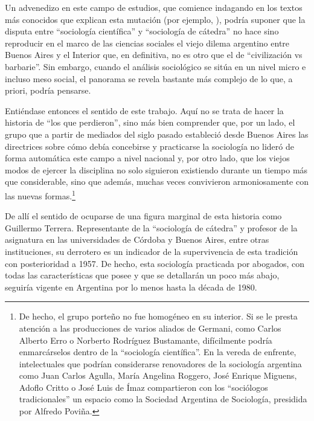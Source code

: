 Un advenedizo en este campo de estudios, que comience indagando en los textos más conocidos que explican esta mutación (por ejemplo, \cite{1681-GERMANI1964}), podría suponer que la disputa entre \enquote{sociología científica} y \enquote{sociología de cátedra} no hace sino reproducir en el marco de las ciencias sociales el viejo dilema argentino entre Buenos Aires y el Interior que, en definitiva, no es otro que el de \enquote{civilización vs barbarie}. Sin embargo, cuando el análisis sociológico se sitúa en un nivel micro e incluso meso social, el panorama se revela bastante más complejo de lo que, a priori, podría pensarse.

Entiéndase entonces el sentido de este trabajo. Aquí no se trata de hacer la historia de \enquote{los que perdieron}, sino más bien comprender que, por un lado, el grupo que a partir de mediados del siglo pasado estableció desde Buenos Aires las directrices sobre cómo debía concebirse y practicarse la sociología no lideró de forma automática este campo a nivel nacional y, por otro lado, que los viejos modos de ejercer la disciplina no solo siguieron existiendo durante un tiempo más que considerable, sino que además, muchas veces convivieron armoniosamente con las nuevas formas.\footnote{De hecho, el grupo porteño no fue homogéneo en su interior. Si se le presta atención a las producciones de varios aliados de Germani, como Carlos Alberto Erro o Norberto Rodríguez Bustamante, difícilmente podría enmarcárselos dentro de la \enquote{sociología científica}. En la vereda de enfrente, intelectuales que podrían considerarse renovadores de la sociología argentina como Juan Carlos Agulla, María Angelina Roggero, José Enrique Miguens, Adoflo Critto o José Luis de Ímaz compartieron con los \enquote{sociólogos tradicionales} un espacio como la Sociedad Argentina de Sociología, presidida por Alfredo Poviña.}

De allí el sentido de ocuparse de una figura marginal de esta historia como Guillermo Terrera. Representante de la \enquote{sociología de cátedra} y profesor de la asignatura en las universidades de Córdoba y Buenos Aires, entre otras instituciones, su derrotero es un indicador de la supervivencia de esta tradición con posterioridad a 1957. De hecho, esta sociología practicada por abogados, con todas las características que posee y que se detallarán un poco más abajo, seguiría vigente en Argentina por lo menos hasta la década de 1980.

